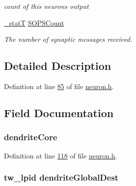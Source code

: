 \begin{DoxyCompactItemize}
\begin{DoxyCompactList}\small\item\em count of this neuron\textquotesingle{}s output \end{DoxyCompactList}\item 
\hyperlink{assist_8h_ad77e6fc5a9b03d46e7c97b7c4b92e89f}{\+\_\+stat\+T} \hyperlink{structneuron_state_a71fbb9a79e8048b473b6e09d29a64bbe}{S\+O\+P\+S\+Count}
\begin{DoxyCompactList}\small\item\em The number of synaptic messages received. \end{DoxyCompactList}\end{DoxyCompactItemize}


\subsection{Detailed Description}


Definition at line \hyperlink{neuron_8h_source_l00085}{85} of file \hyperlink{neuron_8h_source}{neuron.\+h}.



\subsection{Field Documentation}
\hypertarget{structneuron_state_a62463fa4d33c39297aa5ce3a145d474f}{}
\subsubsection[{dendrite\+Core}]{ dendrite\+Core}\label{structneuron_state_a62463fa4d33c39297aa5ce3a145d474f}


Definition at line \hyperlink{neuron_8h_source_l00118}{118} of file \hyperlink{neuron_8h_source}{neuron.\+h}.

\hypertarget{structneuron_state_a4199c14c5aabfd52f441e01623bdc84c}{}
\subsubsection[{dendrite\+Global\+Dest}]{\setlength{\rightskip}{0pt plus 5cm}tw\+\_\+lpid dendrite\+Global\+Dest}\label{structneuron_state_a4199c14c5aabfd52f441e01623bdc84c}


